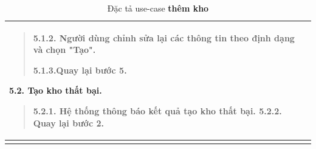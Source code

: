 {\begin{longtable}{| p{} | p{} |}
\begin{quote}
                    5.1.2. Người dùng chỉnh sửa lại các thông tin theo định dạng và chọn "Tạo".
                    
                    5.1.3.Quay lại bước 5.
                    \end{quote}
                5.2. Tạo kho thất bại.
                    \begin{quote}
                    5.2.1. Hệ thống thông báo kết quả tạo kho thất bại.
                    5.2.2. Quay lại bước 2.
                    \end{quote}
                \\
                \hline
                \caption{Đặc tả use-case \textbf{thêm kho}}
            \end{longtable}
        }
    
